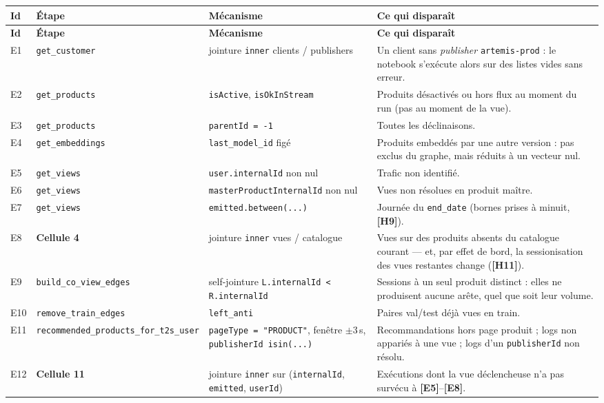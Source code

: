 \documentclass[11pt,a4paper]{article}
\newcommand{\code}[1]{\texttt{\small #1}}
\newcommand{\hyp}[1]{\textcolor{hypcol}{\textbf{\small [#1]}}}
\newcommand{\cell}[1]{\textbf{Cellule #1}}
\begin{document}
{\small
\begin{longtable}{@{}l p{3.2cm} p{4.4cm} p{5.2cm}@{}}
\toprule
\textbf{Id} & \textbf{Étape} & \textbf{Mécanisme} & \textbf{Ce qui disparaît} \\
\midrule
\endfirsthead
\toprule
\textbf{Id} & \textbf{Étape} & \textbf{Mécanisme} & \textbf{Ce qui disparaît} \\
\midrule
\endhead
\bottomrule
\endfoot

E1 & \code{get\_customer} & jointure \code{inner} clients / publishers & Un client sans \emph{publisher} \code{artemis-prod} : le notebook s'exécute alors sur des listes vides sans erreur. \\
E2 & \code{get\_products} & \code{isActive}, \code{isOkInStream} & Produits désactivés ou hors flux au moment du run (pas au moment de la vue). \\
E3 & \code{get\_products} & \code{parentId = -1} & Toutes les déclinaisons. \\
E4 & \code{get\_embeddings} & \code{last\_model\_id} figé & Produits embeddés par une autre version : pas exclus du graphe, mais réduits à un vecteur nul. \\
E5 & \code{get\_views} & \code{user.internalId} non nul & Trafic non identifié. \\
E6 & \code{get\_views} & \code{masterProductInternalId} non nul & Vues non résolues en produit maître. \\
E7 & \code{get\_views} & \code{emitted.between(...)} & Journée du \code{end\_date} (bornes prises à minuit, \hyp{H9}). \\
E8 & \cell{4} & jointure \code{inner} vues / catalogue & Vues sur des produits absents du catalogue courant --- et, par effet de bord, la sessionisation des vues restantes change (\hyp{H11}). \\
E9 & \code{build\_co\_view\_edges} & self-jointure \code{L.internalId < R.internalId} & Sessions à un seul produit distinct : elles ne produisent aucune arête, quel que soit leur volume. \\
E10 & \code{remove\_train\_edges} & \code{left\_anti} & Paires val/test déjà vues en train. \\
E11 & \code{recommended\_products\_for\_t2s\_user} & \code{pageType = "PRODUCT"}, fenêtre $\pm 3$\,s, \code{publisherId isin(...)} & Recommandations hors page produit ; logs non appariés à une vue ; logs d'un \code{publisherId} non résolu. \\
E12 & \cell{11} & jointure \code{inner} sur (\code{internalId}, \code{emitted}, \code{userId}) & Exécutions dont la vue déclencheuse n'a pas survécu à \hyp{E5}--\hyp{E8}. \\

\end{longtable}}
\end{document}
